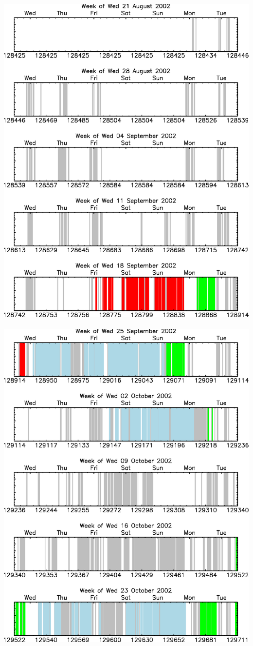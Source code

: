 \documentclass[12pt]{article}
\begin{document}
\mbox{ } \vfill \includegraphics[width=\linewidth]{fits2_dates09.eps} \vfill \mbox{ } \pagebreak
\mbox{ } \vfill \includegraphics[width=\linewidth]{fits2_dates10.eps} \vfill \mbox{ } \pagebreak
\end{document}
